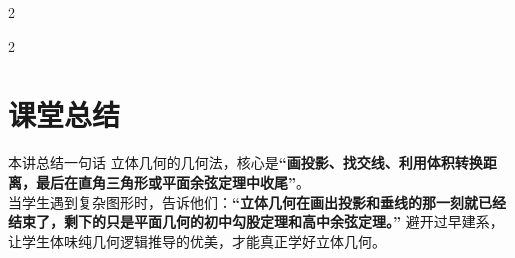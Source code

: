 \documentclass[11pt,a4paper]{ctexart}
\begin{document}
\newpage
{}
{\small \qSolidPracticePyramidDihedralStem}
\begin{center}
  \qSolidPracticePyramidDihedralFigure
\end{center}

\begin{paracol}{2}
\switchcolumn
{}
\end{paracol}

\par\vspace{1.0em}\par\vspace{1.0em}

{\small \qSolidIsoscelesTetrahedronStem}
\begin{center}
  \qSolidIsoscelesTetrahedronFigure
\end{center}

\begin{paracol}{2}
\switchcolumn
{}
\end{paracol}

\section{课堂总结}

\begin{teachbox}{本讲总结一句话}
立体几何的几何法，核心是\textbf{“画投影、找交线、利用体积转换距离，最后在直角三角形或平面余弦定理中收尾”}。\\
当学生遇到复杂图形时，告诉他们：\textbf{“立体几何在画出投影和垂线的那一刻就已经结束了，剩下的只是平面几何的初中勾股定理和高中余弦定理。”} 避开过早建系，让学生体味纯几何逻辑推导的优美，才能真正学好立体几何。
\end{teachbox}
\end{document}
